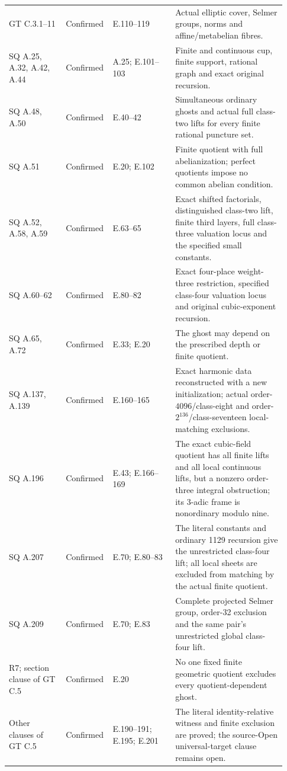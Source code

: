 \begin{longtable}{@{}p{0.20\linewidth}p{0.12\linewidth}p{0.22\linewidth}p{0.39\linewidth}@{}}
GT C.3.1--11 & Confirmed & E.110--119 & Actual elliptic cover, Selmer groups, norms and affine/metabelian fibres. \\
SQ A.25, A.32, A.42, A.44 & Confirmed & A.25; E.101--103 & Finite and continuous cup, finite support, rational graph and exact original recursion. \\
SQ A.48, A.50 & Confirmed & E.40--42 & Simultaneous ordinary ghosts and actual full class-two lifts for every finite rational puncture set. \\
SQ A.51 & Confirmed & E.20; E.102 & Finite quotient with full abelianization; perfect quotients impose no common abelian condition. \\
SQ A.52, A.58, A.59 & Confirmed & E.63--65 & Exact shifted factorials, distinguished class-two lift, finite third layers, full class-three valuation locus and the specified small constants. \\
SQ A.60--62 & Confirmed & E.80--82 & Exact four-place weight-three restriction, specified class-four valuation locus and original cubic-exponent recursion. \\
SQ A.65, A.72 & Confirmed & E.33; E.20 & The ghost may depend on the prescribed depth or finite quotient. \\
SQ A.137, A.139 & Confirmed & E.160--165 & Exact harmonic data reconstructed with a new initialization; actual order-$4096$/class-eight and order-$2^{136}$/class-seventeen local-matching exclusions. \\
SQ A.196 & Confirmed & E.43; E.166--169 & The exact cubic-field quotient has all finite lifts and all local continuous lifts, but a nonzero order-three integral obstruction; its 3-adic frame is nonordinary modulo nine. \\
SQ A.207 & Confirmed & E.70; E.80--83 & The literal constants and ordinary 1129 recursion give the unrestricted class-four lift; all local sheets are excluded from matching by the actual finite quotient. \\
SQ A.209 & Confirmed & E.70; E.83 & Complete projected Selmer group, order-32 exclusion and the same pair's unrestricted global class-four lift. \\
R7; section clause of GT C.5 & Confirmed & E.20 & No one fixed finite geometric quotient excludes every quotient-dependent ghost. \\
Other clauses of GT C.5 & Confirmed & E.190--191; E.195; E.201 & The literal identity-relative witness and finite exclusion are proved; the source-Open universal-target clause remains open. \\

\end{longtable}
